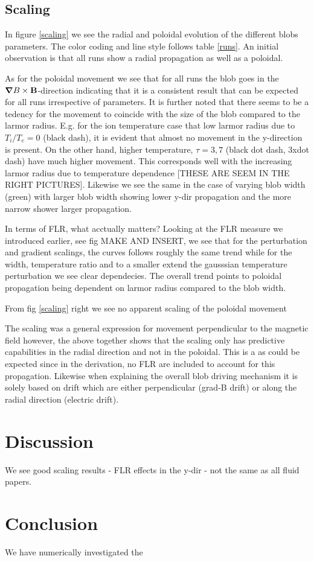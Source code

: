 \documentclass[9pt,twocolumn]{article}
\newcommand{\gv}[1]{\ensuremath{\mbox{\boldmath$ #1 $}}}
\newcommand{\fd}[1]{\mathbf{#1}}
\newcommand{\grad}[1]{\gv{\nabla} #1} %
\renewcommand{\=}[1]{\stackrel{#1}{=}} %
\theoremstyle{definition}
\theoremstyle{remark}
\begin{document}
\subsection{Scaling}

In figure \ref{scaling} we see the radial and poloidal evolution of the different blobs parameters. The color coding and line style follows table \ref{runs}. An initial observation is that all runs show a radial propagation as well as a poloidal. 

As for the poloidal movement we see that for all runs the blob goes in the $\grad B\times \fd B$-direction indicating that it is a consistent result that can be expected for all runs irrespective of parameters. It is further noted that there seems to be a tedency for the movement to coincide with the size of the blob compared to the larmor radius. E.g. for the ion temperature case that low larmor radius due to $T_i/T_e=0$ (black dash), it is evident that almost no movement in the y-direction is present. On the other hand, higher temperature, $\tau={3,7}$ (black dot dash, 3xdot dash) have much higher movement. This corresponds well with the increasing larmor radius due to temperature dependence [THESE ARE SEEM IN THE RIGHT PICTURES]. Likewise we see the same in the case of varying blob width (green) with larger blob width showing lower y-dir propagation and the more narrow shower larger propagation.

In terms of FLR, what acctually matters?
Looking at the FLR measure we introduced earlier, see fig MAKE AND INSERT, we see that for the perturbation and gradient scalings, the curves follows roughly the same trend while for the width, temperature ratio and to a smaller extend the gausssian temperature perturbation we see clear dependecies. The overall trend points to poloidal propagation being dependent on larmor radius compared to the blob width.  

From fig \ref{scaling} right we see no apparent scaling of the poloidal movement 


The scaling was a general expression for movement perpendicular to the magnetic field however, the above together shows that the scaling only has predictive capabilities in the radial direction and not in the poloidal. This is a as could be expected since in the derivation, no FLR are included to account for this propagation. Likewise when explaining the overall blob driving mechanism it is solely based on drift which are either perpendicular (grad-B drift) or along the radial direction (electric drift).  
\section{Discussion}
We see good scaling results - FLR effects in the y-dir - not the same as all fluid papers.

\section{Conclusion}
We have numerically investigated the  


\end{document}
